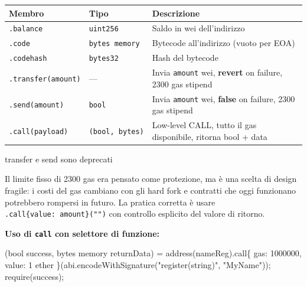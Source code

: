 \documentclass[
  italian,
  openany]{book}
\newenvironment{Shaded}{\begin{snugshade}}{\end{snugshade}}
\newcommand{\NormalTok}[1]{#1}
\newcounter{none} %
\begin{document}
{\def\LTcaptype{none} %
\begin{longtable}[]{@{}
  >{\raggedright\arraybackslash}p{}
  >{\raggedright\arraybackslash}p{}
  >{\raggedright\arraybackslash}p{}@{}}
\toprule\noalign{}
\begin{minipage}[b]{\linewidth}\raggedright
Membro
\end{minipage} & \begin{minipage}[b]{\linewidth}\raggedright
Tipo
\end{minipage} & \begin{minipage}[b]{\linewidth}\raggedright
Descrizione
\end{minipage} \\
\midrule\noalign{}
\endhead
\bottomrule\noalign{}
\endlastfoot
\texttt{.balance} & \texttt{uint256} & Saldo in wei dell'indirizzo \\
\texttt{.code} & \texttt{bytes\ memory} & Bytecode all'indirizzo (vuoto
per EOA) \\
\texttt{.codehash} & \texttt{bytes32} & Hash del bytecode \\
\texttt{.transfer(amount)} & --- & Invia \texttt{amount} wei,
\textbf{revert} on failure, 2300 gas stipend \\
\texttt{.send(amount)} & \texttt{bool} & Invia \texttt{amount} wei,
\textbf{false} on failure, 2300 gas stipend \\
\texttt{.call(payload)} & \texttt{(bool,\ bytes)} & Low-level CALL,
tutto il gas disponibile, ritorna bool + data \\
\end{longtable}
}

\begin{calloutwarning}{transfer e send sono deprecati}

Il limite fisso di 2300 gas era pensato come protezione, ma è una scelta
di design fragile: i costi del gas cambiano con gli hard fork e
contratti che oggi funzionano potrebbero rompersi in futuro. La pratica
corretta è usare \texttt{.call\{value:\ amount\}("")} con controllo
esplicito del valore di ritorno.

\end{calloutwarning}

\textbf{Uso di \texttt{call} con selettore di funzione:}

\begin{Shaded}
\begin{Highlighting}[]
\NormalTok{(bool success, bytes memory returnData) = address(nameReg).call\{}
\NormalTok{    gas: 1000000,}
\NormalTok{    value: 1 ether}
\NormalTok{\}(abi.encodeWithSignature("register(string)", "MyName"));}
\NormalTok{require(success);}
\end{Highlighting}
\end{Shaded}
\end{document}

